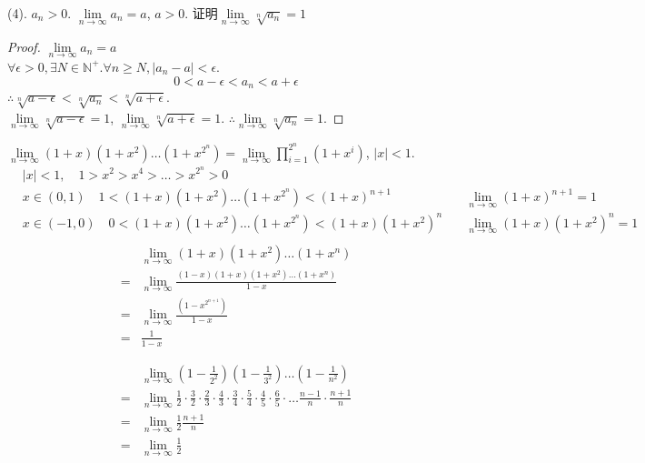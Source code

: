 
(4). $ a_n>0 $. $ \lim\limits_{n\rightarrow\infty}a_n = a $, $ a>0 $. 证明$ \lim\limits_{n\rightarrow\infty} \sqrt[n]{a_n}=1 $
\begin{proof}
	
	$ \lim\limits_{n\rightarrow\infty}a_n = a $\\
	$\forall \epsilon >0, \exists N \in \mathbb{N}^+. \forall n \geqslant N, |a_n-a| < \epsilon$.
	\begin{equation*}
		0<a-\epsilon<a_n<a+\epsilon
	\end{equation*}
	$ \therefore \sqrt[n]{a-\epsilon}<\sqrt[n]{a_n}<\sqrt[n]{a+\epsilon} $.\\
	$ \lim\limits_{n\rightarrow\infty}\sqrt[n]{a-\epsilon} = 1 $,
	$ \lim\limits_{n\rightarrow\infty}\sqrt[n]{a+\epsilon} = 1 $. $ \therefore  \lim\limits_{n\rightarrow\infty}\sqrt[n]{a_n} = 1  $.
	
\end{proof}

$ \lim\limits_{n\rightarrow\infty}(1+x)(1+x^2)\dots(1+x^{2^n}) = \lim\limits_{n\rightarrow\infty}\prod_{i=1}^{2^n}(1+x^i) $, $ |x| <1 $.
\begin{align*}
	&|x|<1,\quad 1>x^2>x^4>\dots>x^{2^n}>0&\\
	&x\in(0,1)\quad 1<(1+x)(1+x^2)\dots(1+x^{2^n})<(1+x)^{n+1}\quad &\lim_{n\rightarrow\infty}(1+x)^{n+1}=1\\
	&x\in(-1,0)\quad 0<(1+x)(1+x^2)\dots(1+x^{2^n})<(1+x)(1+x^2)^{n}\quad &\lim_{n\rightarrow\infty}(1+x)(1+x^2)^{n}=1\\
\end{align*}
\begin{align*}
	&\lim_{n\rightarrow\infty} (1+x)(1+x^2)\dots(1+x^n)\\
	=&\lim_{n\rightarrow\infty} \frac{(1-x)(1+x)(1+x^2)\dots(1+x^n)}{1-x}\\
	=&\lim_{n\rightarrow\infty} \frac{(1-x^{2^{n+1}})}{1-x}\\
	=&\frac{1}{1-x}
\end{align*}


\begin{align*}
	&\lim_{n\rightarrow\infty}(1-\frac{1}{2^2})(1-\frac{1}{3^2})\dots(1-\frac{1}{n^2})\\
	=&\lim_{n\rightarrow\infty}
	\frac{1}{2}\cdot\frac{3}{2}\cdot
	\frac{2}{3}\cdot\frac{4}{3}\cdot
	\frac{3}{4}\cdot\frac{5}{4}\cdot
	\frac{4}{5}\cdot\frac{6}{5}\cdot
	\dots
	\frac{n-1}{n}\cdot\frac{n+1}{n}\\
	=&\lim_{n\rightarrow\infty}\frac{1}{2}\frac{n+1}{n}\\
	=&\lim_{n\rightarrow\infty}\frac{1}{2}		 
\end{align*}

